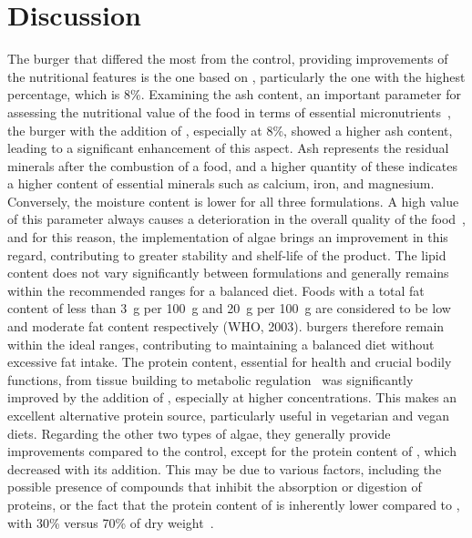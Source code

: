 \section{Discussion}
The burger that differed the most from the control, providing improvements of the nutritional features is the one based on , particularly the one with the highest percentage, which is 8\%. Examining the ash content, an important parameter for assessing the nutritional value of the food in terms of essential micronutrients~\parencite{harris_Ash_2017}, the burger with the addition of , especially at 8\%, showed a higher ash content, leading to a significant enhancement of this aspect. Ash represents the residual minerals after the combustion of a food, and a higher quantity of these indicates a higher content of essential minerals such as calcium, iron, and magnesium.
Conversely, the moisture content is lower for all three  formulations. A high value of this parameter always causes a deterioration in the overall quality of the food~\parencite{roudaut_Moisture_2010}, and for this reason, the implementation of algae brings an improvement in this regard, contributing to greater stability and shelf-life of the product.
The lipid content does not vary significantly between formulations and generally remains within the recommended ranges for a balanced diet. Foods with a total fat content of less than \qty{3}{\gram} per \qty{100}{\gram} and \qty{20}{\gram} per \qty{100}{\gram} are considered to be low and moderate fat content respectively (WHO, 2003).  burgers therefore remain within the ideal ranges, contributing to maintaining a balanced diet without excessive fat intake.
The protein content, essential for health and crucial bodily functions, from tissue building to metabolic regulation~\parencite{chang_Protein_2017} was significantly improved by the addition of , especially at higher concentrations. This makes  an excellent alternative protein source, particularly useful in vegetarian and vegan diets.
Regarding the other two types of algae, they generally provide improvements compared to the control, except for the protein content of , which decreased with its addition.
This may be due to various factors, including the possible presence of compounds that inhibit the absorption or digestion of proteins, or the fact that the protein content of  is inherently lower compared to , with 30\% versus 70\% of dry weight~\parencite{fleurence_Seaweed_2004}.
